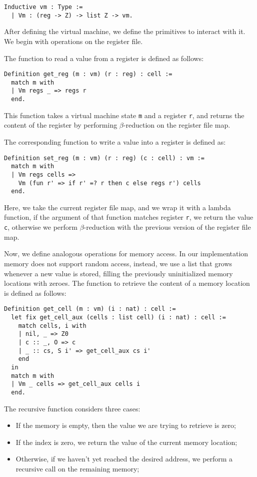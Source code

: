 \begin{lstlisting}[style=Coq]
Inductive vm : Type :=
  | Vm : (reg -> Z) -> list Z -> vm.
\end{lstlisting}

After defining the virtual machine, we define the primitives to interact with it. We begin with operations on the register file.

The function to read a value from a register is defined as follows:

\begin{lstlisting}[style=Coq]
Definition get_reg (m : vm) (r : reg) : cell :=
  match m with
  | Vm regs _ => regs r
  end.
\end{lstlisting}

This function takes a virtual machine state \texttt m and a register \texttt r, and returns the content of the register  by performing $\beta$-reduction on the register file map.

The corresponding function to write a value into a register is defined as:

\begin{lstlisting}[style=Coq]
Definition set_reg (m : vm) (r : reg) (c : cell) : vm :=
  match m with
  | Vm regs cells =>
    Vm (fun r' => if r' =? r then c else regs r') cells
  end.
\end{lstlisting}

Here, we take the current register file map, and we wrap it with a lambda function, if the argument of that function matches register \texttt r, we return the value \texttt c, otherwise we perform $\beta$-reduction with the previous version of the register file map.

Now, we define analogous operations for memory access. In our implementation memory does not support random access, instead, we use a list that grows whenever a new value is stored, filling the previously uninitialized memory locations with zeroes. The function to retrieve the content of a memory location is defined as follows:

\begin{lstlisting}[style=Coq]
Definition get_cell (m : vm) (i : nat) : cell :=
  let fix get_cell_aux (cells : list cell) (i : nat) : cell :=
    match cells, i with
    | nil, _ => Z0
    | c :: _, O => c
    | _ :: cs, S i' => get_cell_aux cs i'
    end
  in
  match m with
  | Vm _ cells => get_cell_aux cells i
  end.
\end{lstlisting}

The recursive function considers three cases:
\begin{itemize}
  \item If the memory is empty, then the value we are trying to retrieve is zero;
  \item If the index is zero, we return the value of the current memory location;
  \item Otherwise, if we haven't yet reached the desired address, we perform a recursive call on the remaining memory;
\end{itemize}

